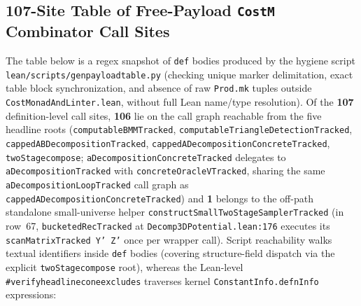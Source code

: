 \documentclass[10pt,letterpaper]{article}
\renewcommand{\_}{\origunderscore\allowbreak}
\newcommand{\code}[1]{\texttt{#1}}
\begin{document}
\subsection*{107-Site Table of Free-Payload \code{CostM} Combinator Call Sites}

The table below is a regex snapshot of \code{def} bodies produced by the hygiene script \code{lean/scripts/gen\_payload\_table.py} (checking unique marker delimitation, exact table block synchronization, and absence of raw \code{Prod.mk} tuples outside \code{CostMonadAndLinter.lean}, without full Lean name/type resolution). Of the \textbf{107} definition-level call sites, \textbf{106} lie on the call graph reachable from the five headline roots (\code{computableBMMTracked}, \code{computableTriangleDetectionTracked}, \code{cappedABDecompositionTracked}, \code{cappedADecompositionConcreteTracked}, \code{twoStage\_compose}; \code{aDecompositionConcreteTracked} delegates to \code{aDecompositionTracked} with \code{concreteOracleVTracked}, sharing the same \code{aDecompositionLoopTracked} call graph as \code{cappedADecompositionConcreteTracked}) and \textbf{1} belongs to the off-path standalone small-universe helper \code{constructSmallTwoStageSamplerTracked} (in row~67, \code{bucketedRecTracked} at \code{Decomp3DPotential.lean:176} executes its \code{scanMatrixTracked Y' Z'} once per wrapper call). Script reachability walks textual identifiers inside \code{def} bodies (covering structure-field dispatch via the explicit \code{twoStage\_compose} root), whereas the Lean-level \code{\#verify\_headline\_cone\_excludes} traverses kernel \code{ConstantInfo.defnInfo} expressions:
\end{document}
